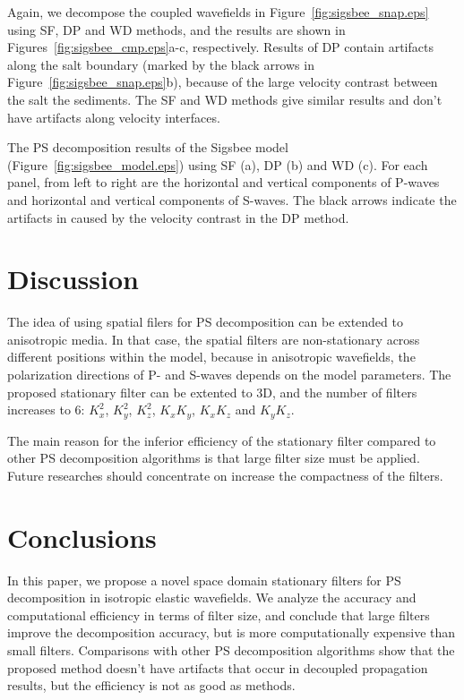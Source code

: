 \documentclass[manuscript,ulem,graphix,revised]{geophysics}
\begin{document}
Again, we decompose the coupled wavefields in Figure~\ref{fig:sigsbee_snap.eps} using SF, DP and WD methods, and the results are shown in Figures~\ref{fig:sigsbee_cmp.eps}a-c, respectively. Results of DP contain artifacts along the salt boundary (marked by the black arrows in Figure~\ref{fig:sigsbee_snap.eps}b), because of the large velocity contrast between the salt the sediments. The SF and WD methods give similar results and don't have artifacts along velocity interfaces. 

{
The PS decomposition results of the Sigsbee model (Figure~\ref{fig:sigsbee_model.eps}) using SF (a), DP (b) and WD (c). For each panel, from left to right are the horizontal and vertical components of P-waves and horizontal and vertical components of S-waves. The black arrows indicate the artifacts in caused by the velocity contrast in the DP method.
}


\section{Discussion}
\indent\indent
The idea of using spatial filers for PS decomposition can be extended to anisotropic media. In that case, the spatial filters are non-stationary across different positions within the model, because in anisotropic wavefields, the polarization directions of P- and S-waves depends on the model parameters.
The proposed stationary filter can be extented to 3D, and the number of filters increases to 6: $K^2_{x}$, $K^2_{y}$, $K^2_{z}$, $K_xK_y$, $K_xK_z$ and $K_yK_z$.

The main reason for the inferior efficiency of the stationary filter compared to other PS decomposition algorithms is that large filter size must be applied. Future researches should concentrate on increase the compactness of the filters. 


\section{Conclusions}

In this paper, we propose a novel space domain stationary filters for PS decomposition in isotropic elastic wavefields. We analyze the accuracy and computational efficiency in terms of filter size, and conclude that large filters improve the decomposition accuracy, but is more computationally expensive than small filters. Comparisons with other PS decomposition algorithms show that the proposed method doesn't have artifacts that occur in decoupled propagation results, but the efficiency is not as good as methods. 
\end{document}
